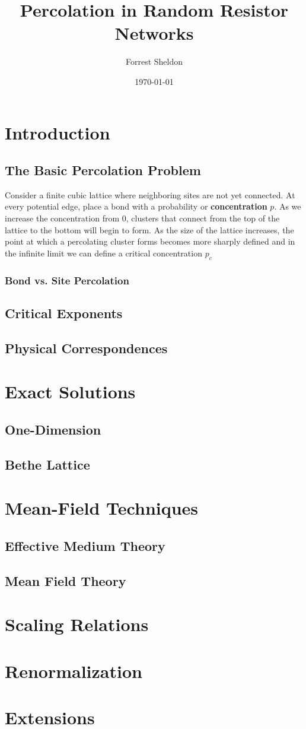 
\title{Percolation in Random Resistor Networks}
\author{Forrest Sheldon}
\date{\today}

\maketitle

\section{Introduction}

\subsection{The Basic Percolation Problem}

Consider a finite cubic lattice where neighboring sites are not yet connected.
At every potential edge, place a bond with a probability or \textbf{concentration}
$p$. As we increase the concentration from 0, clusters that connect from the
top of the lattice to the bottom will begin to form.  As the size of the lattice
increases, the point at which a percolating cluster forms becomes more sharply
defined and in the infinite limit we can define a critical concentration
$p_c$

\subsubsection{Bond vs. Site Percolation}
\subsection{Critical Exponents}
\subsection{Physical Correspondences}
\section{Exact Solutions}
\subsection{One-Dimension}
\subsection{Bethe Lattice}
\section{Mean-Field Techniques}
\subsection{Effective Medium Theory}
\subsection{Mean Field Theory}
\section{Scaling Relations}
\section{Renormalization}
\section{Extensions}

